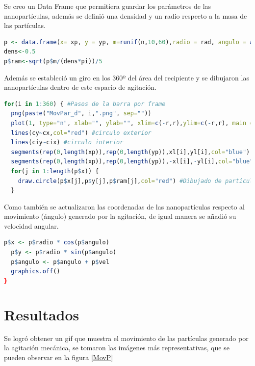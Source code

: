 \documentclass[12pt, letterpaper] {article}
\begin{document}
Se creo un Data Frame que permitiera guardar los parámetros de las nanopartículas, además se definió una densidad y un radio respecto a la masa de las partículas.

\begin{lstlisting}[language=R]
p <- data.frame(x= xp, y = yp, m=runif(n,10,60),radio = rad, angulo = atan2(yp,xp),vel = (2*pi)/sample(180:450,length(xp)))
dens<-0.5
p$ram<-sqrt(p$m/(dens*pi))/5 
\end{lstlisting}

Además se estableció un giro en los 360º del área del recipiente y se dibujaron las nanopartículas dentro de este espacio de agitación.

\begin{lstlisting}[language=R]
for(i in 1:360) { #Pasos de la barra por frame
  png(paste("MovPar_d", i,".png", sep=""))
  plot(1, type="n", xlab="", ylab="", xlim=c(-r,r),ylim=c(-r,r), main = paste("angulo: ", i, sep = '') )
  lines(cy~cx,col="red") #circulo exterior
  lines(ciy~cix) #circulo interior
  segments(rep(0,length(xp)),rep(0,length(yp)),xl[i],yl[i],col="blue") #Barra 0 grados
  segments(rep(0,length(xp)),rep(0,length(yp)),-xl[i],-yl[i],col="blue") #Barra 180 grados
  for(j in 1:length(p$x)) {
    draw.circle(p$x[j],p$y[j],p$ram[j],col="red") #Dibujado de particulas
  }
\end{lstlisting}

Como también se actualizaron las coordenadas de las nanopartículas respecto al movimiento (ángulo) generado por la agitación, de igual manera se añadió su velocidad angular.

\begin{lstlisting}[language=R]
  p$x <- p$radio * cos(p$angulo) 
  p$y <- p$radio * sin(p$angulo)
  p$angulo <- p$angulo + p$vel 
  graphics.off()
}
\end{lstlisting}

 
\section{Resultados}

Se logró obtener un gif que muestra el movimiento de las partículas generado por la agitación mecánica, se tomaron las imágenes más representativas, que se pueden observar en la figura \ref{MovP}
\end{document}
